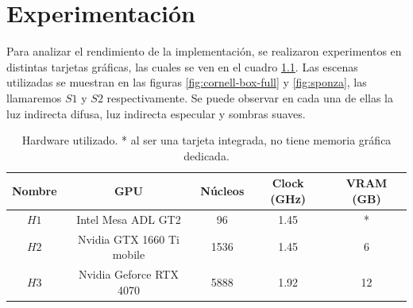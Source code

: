 \graphicspath{{chapters/5_experimentos/figures/}}

\chapter{Experimentación}\label{chap:experiments}

Para analizar el rendimiento de la implementación, se realizaron experimentos en distintas tarjetas gráficas, las cuales se ven en el cuadro \ref{tab:hardware-used}.
Las escenas utilizadas se muestran en las figuras \ref{fig:cornell-box-full} y \ref{fig:sponza}, las llamaremos $S1$ y $S2$ respectivamente.
Se puede observar en cada una de ellas la luz indirecta difusa, luz indirecta especular y sombras suaves.

\begin{table}[ht]
	\centering
	\begin{tabular}{|c|c|c|c|c|}
		\hline
		\textbf{Nombre} & \textbf{GPU} & \textbf{Núcleos} & \textbf{Clock (GHz)} & \textbf{VRAM (GB)} \\
		\hline
		$H1$ & Intel Mesa ADL GT2 & 96 & 1.45 & * \\
		\hline
		$H2$ & Nvidia GTX 1660 Ti mobile & 1536 & 1.45 & 6 \\
		\hline
		$H3$ & Nvidia Geforce RTX 4070 & 5888 & 1.92 & 12 \\
		\hline
	\end{tabular}
	\caption{Hardware utilizado. * al ser una tarjeta integrada, no tiene memoria gráfica dedicada.}
	\label{tab:hardware-used}
\end{table}


